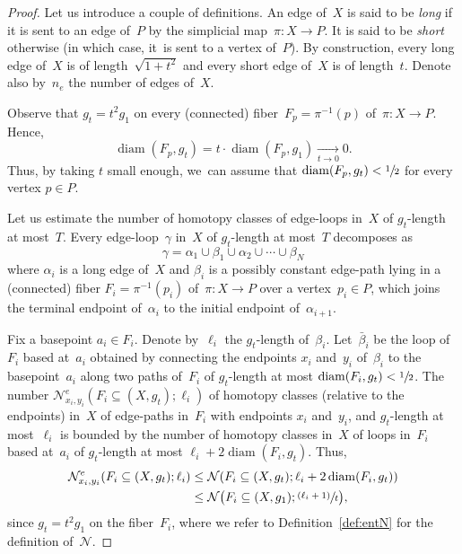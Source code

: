 \documentclass[11pt]{article}
\let\oldsfrac\sfrac
\renewcommand{\sfrac}[2]{{\oldsfrac{#1}{#2}}}
\newcommand{\psfrac}[2]{\sfrac{(#1)}{#2}}
\theoremstyle{definition}
\DeclareMathOperator\diam{diam}
\numberwithin{equation}{section}
\begin{document}
\begin{proof}
Let us introduce a couple of definitions.
An edge of~$X$ is said to be \emph{long} if it is sent to an edge of~$P$ by the simplicial map~$\pi:X \to P$.
It is said to be \emph{short} otherwise (in which case, it~is sent to a vertex of~$P$).
By construction, every long edge of~$X$ is of length~$\sqrt{1+t^2}$ and every short edge of~$X$ is of length~$t$.
Denote also by~$n_e$ the number of edges of~$X$.

Observe that $g_t = t^2 g_1$ on every (connected) fiber~$F_p=\pi^{-1}(p)$ of~$\pi:X \to P$.
Hence,\vspace*{-3pt}
\[
\diam(F_p,g_t) = t \cdot \diam(F_p,g_1) \xrightarrow[t \to 0]{} 0.
\]
Thus, by taking $t$ small enough, we~can assume that $\diam(F_p,g_t) < \sfrac{1}{2}$ for every vertex $p \in P$.

Let us estimate the number of homotopy classes of edge-loops in~$X$ of \mbox{$g_t$-length} at most~$T$.
Every edge-loop~$\gamma$ in~$X$ of $g_t$-length at most~$T$ decomposes as\vspace*{-3pt}
\begin{equation} \label{eq:decomp}
\gamma = \alpha_1 \cup \beta_1 \cup \alpha_2 \cup \cdots \cup \beta_N
\end{equation}
where $\alpha_i$ is a long edge of~$X$ and $\beta_i$ is a possibly constant edge-path lying in a (connected) fiber $F_i=\pi^{-1}(p_i)$ of~$\pi:X \to P$ over a vertex~$p_i \in P$, which joins the terminal endpoint of~$\alpha_i$ to the initial endpoint of~$\alpha_{i+1}$.

Fix a basepoint $a_i \in F_i$.
Denote by~$\ell_i$ the $g_t$-length of~$\beta_i$.
Let~$\bar{\beta}_i$ be the loop of~$F_i$ based at~$a_i$ obtained by connecting the endpoints $x_i$ and~$y_i$ of~$\beta_i$ to the basepoint~$a_i$ along two paths of~$F_i$ of $g_t$-length at most $\diam(F_i,g_t) < \sfrac{1}{2}$.
The number \hbox{$\mathcal{N}^e_{{x_i},{y_i}}(F_i \subseteq (X,g_t);\ell_i)$} of homotopy classes (relative to the endpoints) in~$X$ of edge-paths in~$F_i$ with endpoints $x_i$ and~$y_i$, and $g_t$-length at most~$\ell_i$ is bounded by the number of homotopy classes in~$X$ of loops in~$F_i$ based at~$a_i$ of $g_t$-length at most $\ell_i + 2 \diam(F_i,g_t)$.
Thus,\vspace*{-2pt}
\begin{equation}\label{eq:N1}
\begin{aligned}
\mathcal{N}^e_{{x_i},{y_i}}(F_i \subseteq (X,g_t);\ell_i) & \leq \mathcal{N}(F_i \subseteq (X,g_t); \ell_i + 2 \diam(F_i,g_t))\\
& \leq \mathcal{N} \bigl(F_i \subseteq (X,g_1); \psfrac{\ell_i + 1}{t} \bigr),
\end{aligned}
\end{equation}
since $g_t = t^2 g_1$ on the fiber~$F_i$, where we refer to Definition~\ref{def:entN} for the definition of~$\mathcal{N}$.


\end{proof}
\end{document}
